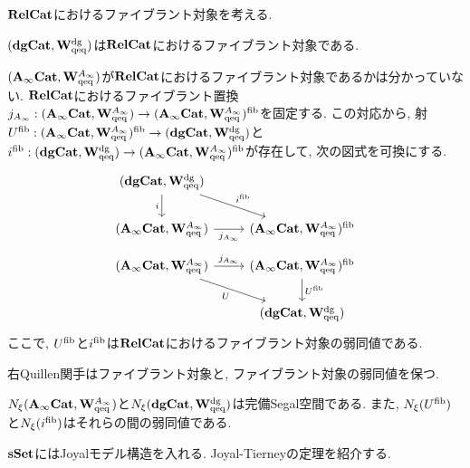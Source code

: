 \documentclass[uplatex, a4paper, 14Q, dvipdfmx]{jsarticle}
\begin{document}
$\mathbf{RelCat}$におけるファイブラント対象を考える. 

\begin{theorem}
  $(\mathbf{dgCat}, \mathbf{W}^{\mathrm{dg}}_\mathrm{qeq})$は$\mathbf{RelCat}$におけるファイブラント対象である.
\end{theorem}

\begin{remark}
  $(\mathbf{A}_\infty\mathbf{Cat}, \mathbf{W}^{A_{\infty}}_\mathrm{qeq})$が$\mathbf{RelCat}$におけるファイブラント対象であるかは分かっていない.
  $\mathbf{RelCat}$におけるファイブラント置換$j_{A_{\infty}} : (\mathbf{A}_\infty\mathbf{Cat}, \mathbf{W}^{A_{\infty}}_\mathrm{qeq}) \to (\mathbf{A}_\infty\mathbf{Cat}, \mathbf{W}^{A_{\infty}}_\mathrm{qeq})^{\mathrm{fib}}$を固定する.
  この対応から, 射$U^{\mathrm{fib}} : (\mathbf{A}_\infty\mathbf{Cat}, \mathbf{W}^{A_{\infty}}_\mathrm{qeq})^{\mathrm{fib}} \to (\mathbf{dgCat}, \mathbf{W}^{\mathrm{dg}}_\mathrm{qeq})$と$i^{\mathrm{fib}} : (\mathbf{dgCat}, \mathbf{W}^{\mathrm{dg}}_\mathrm{qeq}) \to (\mathbf{A}_\infty\mathbf{Cat}, \mathbf{W}^{A_{\infty}}_\mathrm{qeq})^{\mathrm{fib}}$が存在して, 次の図式を可換にする.
  \[\begin{tikzcd}
    {(\dgcat, \Wdgqeq)} \\
    {(\Ainfcat, \WAinfqeq)} & {(\Ainfcat, \WAinfqeq)^\fib }
    \arrow["i"', from=1-1, to=2-1]
    \arrow["{j_{\Ainf}}"', from=2-1, to=2-2]
    \arrow["{i^\fib}", from=1-1, to=2-2]
  \end{tikzcd}\]
  \[\begin{tikzcd}
    {(\Ainfcat, \WAinfqeq)} & {(\Ainfcat, \WAinfqeq)^\fib } \\
    & {(\dgcat, \Wdgqeq)}
    \arrow["U"', from=1-1, to=2-2]
    \arrow["{j_{\Ainf}}", from=1-1, to=1-2]
    \arrow["{U^\fib}", from=1-2, to=2-2]
  \end{tikzcd}\]
  ここで, $U^{\mathrm{fib}}$と$i^{\mathrm{fib}}$は$\mathbf{RelCat}$におけるファイブラント対象の弱同値である.
\end{remark}

右Quillen関手はファイブラント対象と, ファイブラント対象の弱同値を保つ.

\begin{corollary}
  $N_\xi(\mathbf{A}_\infty\mathbf{Cat}, \mathbf{W}^{A_{\infty}}_\mathrm{qeq})$と$N_\xi(\mathbf{dgCat}, \mathbf{W}^{\mathrm{dg}}_\mathrm{qeq})$は完備Segal空間である.
  また, $N_\xi(U^{\mathrm{fib}})$と$N_\xi(i^{\mathrm{fib}})$はそれらの間の弱同値である.
\end{corollary}

$\mathbf{sSet}$にはJoyalモデル構造を入れる. 
Joyal-Tierneyの定理を紹介する.
\end{document}
